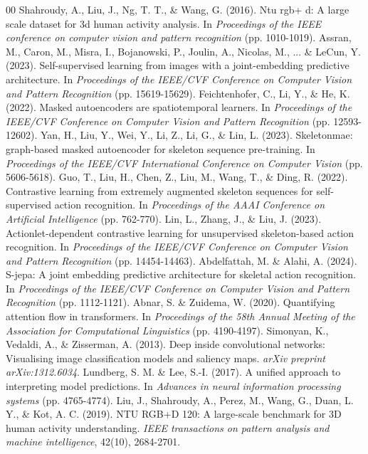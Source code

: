 \documentclass[conference]{IEEEtran}
\begin{document}
\begin{thebibliography}{00}
 Shahroudy, A., Liu, J., Ng, T. T., \& Wang, G. (2016). Ntu rgb+ d: A large scale dataset for 3d human activity analysis. In \textit{Proceedings of the IEEE conference on computer vision and pattern recognition} (pp. 1010-1019).
 Assran, M., Caron, M., Misra, I., Bojanowski, P., Joulin, A., Nicolas, M., ... \& LeCun, Y. (2023). Self-supervised learning from images with a joint-embedding predictive architecture. In \textit{Proceedings of the IEEE/CVF Conference on Computer Vision and Pattern Recognition} (pp. 15619-15629).
 Feichtenhofer, C., Li, Y., \& He, K. (2022). Masked autoencoders are spatiotemporal learners. In \textit{Proceedings of the IEEE/CVF Conference on Computer Vision and Pattern Recognition} (pp. 12593-12602).
 Yan, H., Liu, Y., Wei, Y., Li, Z., Li, G., \& Lin, L. (2023). Skeletonmae: graph-based masked autoencoder for skeleton sequence pre-training. In \textit{Proceedings of the IEEE/CVF International Conference on Computer Vision} (pp. 5606-5618).
 Guo, T., Liu, H., Chen, Z., Liu, M., Wang, T., \& Ding, R. (2022). Contrastive learning from extremely augmented skeleton sequences for self-supervised action recognition. In \textit{Proceedings of the AAAI Conference on Artificial Intelligence} (pp. 762-770).
 Lin, L., Zhang, J., \& Liu, J. (2023). Actionlet-dependent contrastive learning for unsupervised skeleton-based action recognition. In \textit{Proceedings of the IEEE/CVF Conference on Computer Vision and Pattern Recognition} (pp. 14454-14463).
 Abdelfattah, M. \& Alahi, A. (2024). S-jepa: A joint embedding predictive architecture for skeletal action recognition. In \textit{Proceedings of the IEEE/CVF Conference on Computer Vision and Pattern Recognition} (pp. 1112-1121).
 Abnar, S. \& Zuidema, W. (2020). Quantifying attention flow in transformers. In \textit{Proceedings of the 58th Annual Meeting of the Association for Computational Linguistics} (pp. 4190-4197).
 Simonyan, K., Vedaldi, A., \& Zisserman, A. (2013). Deep inside convolutional networks: Visualising image classification models and saliency maps. \textit{arXiv preprint arXiv:1312.6034}.
 Lundberg, S. M. \& Lee, S.-I. (2017). A unified approach to interpreting model predictions. In \textit{Advances in neural information processing systems} (pp. 4765-4774).
 Liu, J., Shahroudy, A., Perez, M., Wang, G., Duan, L. Y., \& Kot, A. C. (2019). NTU RGB+D 120: A large-scale benchmark for 3D human activity understanding. \textit{IEEE transactions on pattern analysis and machine intelligence}, 42(10), 2684-2701.

\end{thebibliography}
\end{document}
